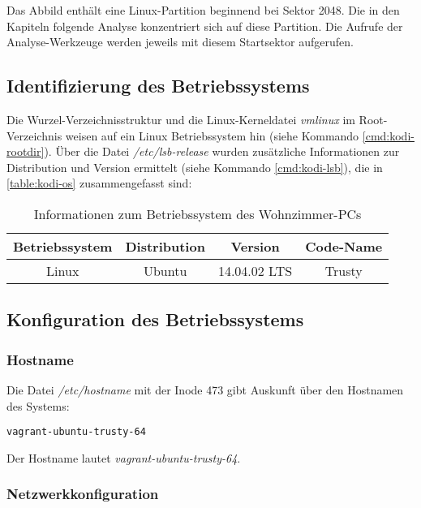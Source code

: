 Das Abbild enthält eine Linux-Partition beginnend bei Sektor 2048. Die in den Kapiteln folgende Analyse konzentriert sich auf diese Partition. Die Aufrufe der Analyse-Werkzeuge werden jeweils mit diesem Startsektor aufgerufen.

\subsection{Identifizierung des Betriebssystems}
\label{sec:kodi-os}

Die Wurzel-Verzeichnisstruktur und die Linux-Kerneldatei \textit{vmlinux} im Root-Verzeichnis weisen auf ein Linux Betriebssystem hin (siehe Kommando \autoref{cmd:kodi-rootdir}). Über die Datei \textit{/etc/lsb-release} wurden zusätzliche Informationen zur Distribution und Version ermittelt (siehe Kommando \autoref{cmd:kodi-lsb}), die in \autoref{table:kodi-os} zusammengefasst sind:

\begin{table}[H]
\centering
\begin{tabular}{cccc}
\toprule 
Betriebssystem & Distribution & Version & Code-Name \\ 
\midrule
Linux & Ubuntu & 14.04.02 LTS & Trusty \\ 
\bottomrule
\end{tabular} 
\caption{Informationen zum Betriebssystem des Wohnzimmer-PCs}
\label{table:kodi-os}
\end{table}

\subsection{Konfiguration des Betriebssystems}

\subsubsection{Hostname}
\label{sec:kodi-hostname}

Die Datei \textit{/etc/hostname} mit der Inode 473 gibt Auskunft über den Hostnamen des Systems:

\begin{cmd}
\begin{verbatim}
vagrant-ubuntu-trusty-64
\end{verbatim}
\caption{icat -o 2048 kodi.raw 473}
\end{cmd}

Der Hostname lautet \textit{vagrant-ubuntu-trusty-64}.

\subsubsection{Netzwerkkonfiguration}
\label{sec:kodi-network}

